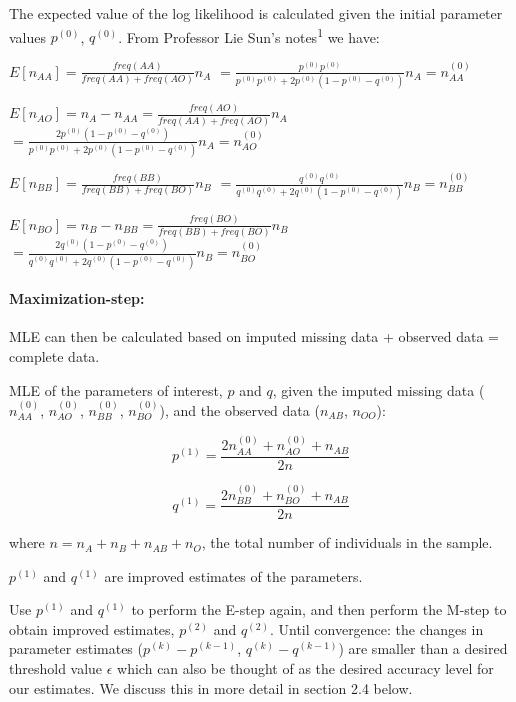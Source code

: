 \documentclass[]{article}
\let\oldparagraph\paragraph
\renewcommand{\paragraph}[1]{\oldparagraph{#1}\mbox{}}
\begin{document}
The expected value of the log likelihood is calculated given the initial
parameter values \(p^{(0)}\), \(q^{(0)}\). From Professor Lie Sun's
notes\textsuperscript{1} we have:

\(E[n_{AA}] = \frac{freq(AA)}{freq(AA)+freq(AO)} n_A\) \hspace*{1.8cm}
\(=\frac{p^{(0)}p^{(0)}}{p^{(0)}p^{(0)}+2p^{(0)}(1-p^{(0)}-q^{(0)})} n_A = n_{AA}^{(0)}\)

\(E[n_{AO}] = n_A-n_{AA} = \frac{freq(AO)}{freq(AA)+freq(AO)} n_A\)
\hspace*{1.8cm}
\(=\frac{2p^{(0)}(1-p^{(0)}-q^{(0)})}{p^{(0)}p^{(0)}+2p^{(0)}(1-p^{(0)}-q^{(0)})} n_A = n_{AO}^{(0)}\)

\(E[n_{BB}] = \frac{freq(BB)}{freq(BB)+freq(BO)} n_B\) \hspace*{1.8cm}
\(=\frac{q^{(0)}q^{(0)}}{q^{(0)}q^{(0)}+2q^{(0)}(1-p^{(0)}-q^{(0)})} n_B = n_{BB}^{(0)}\)

\(E[n_{BO}] = n_B-n_{BB} = \frac{freq(BO)}{freq(BB)+freq(BO)} n_B\)
\hspace*{1.8cm}
\(=\frac{2q^{(0)}(1-p^{(0)}-q^{(0)})}{q^{(0)}q^{(0)}+2q^{(0)}(1-p^{(0)}-q^{(0)})} n_B = n_{BO}^{(0)}\)

\paragraph{Maximization-step:}\label{maximization-step}

MLE can then be calculated based on imputed missing data + observed data
= complete data.

MLE of the parameters of interest, \(p\) and \(q\), given the imputed
missing data (\(n_{AA}^{(0)}\), \(n_{AO}^{(0)}\), \(n_{BB}^{(0)}\),
\(n_{BO}^{(0)}\)), and the observed data (\(n_{AB}\), \(n_{OO}\)):

\[p^{(1)} = \frac{2n_{AA}^{(0)}+n_{AO}^{(0)}+n_{AB}}{2n}\]

\[q^{(1)} = \frac{2n_{BB}^{(0)}+n_{BO}^{(0)}+n_{AB}}{2n}\]

where \(n=n_{A}+n_{B}+n_{AB}+n_{O}\), the total number of individuals in
the sample.

\(p^{(1)}\) and \(q^{(1)}\) are improved estimates of the parameters.

Use \(p^{(1)}\) and \(q^{(1)}\) to perform the E-step again, and then
perform the M-step to obtain improved estimates, \(p^{(2)}\) and
\(q^{(2)}\). Until convergence: the changes in parameter estimates
(\(p^{(k)}-p^{(k-1)}\), \(q^{(k)}-q^{(k-1)}\)) are smaller than a
desired threshold value \(\epsilon\) which can also be thought of as the
desired accuracy level for our estimates. We discuss this in more detail
in section 2.4 below.
\end{document}
